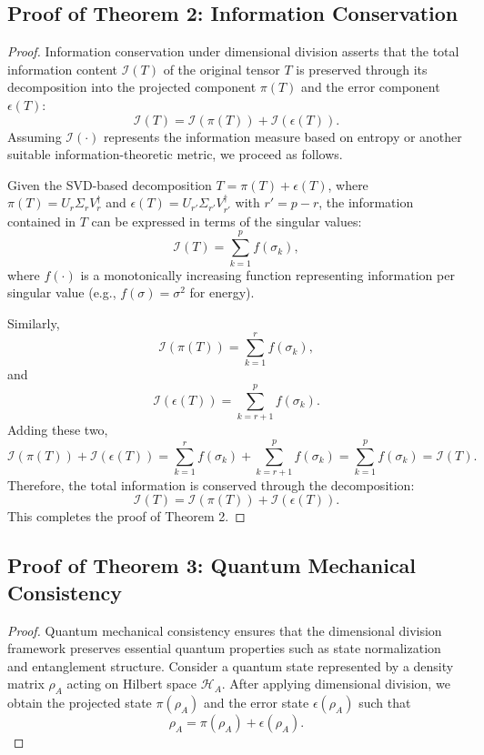 \documentclass[sn-mathphys-num]{sn-jnl}
\theoremstyle{thmstyleone}
\theoremstyle{thmstyletwo}
\theoremstyle{thmstylethree}
\begin{document}
\begin{appendices}
\subsection{Proof of Theorem 2: Information Conservation}\label{proof:theorem2}

\begin{proof}
Information conservation under dimensional division asserts that the total information content \( \mathcal{I}(T) \) of the original tensor \( T \) is preserved through its decomposition into the projected component \( \pi(T) \) and the error component \( \epsilon(T) \):
\[
\mathcal{I}(T) = \mathcal{I}(\pi(T)) + \mathcal{I}(\epsilon(T)).
\]
Assuming \( \mathcal{I}(\cdot) \) represents the information measure based on entropy or another suitable information-theoretic metric, we proceed as follows.

Given the SVD-based decomposition \( T = \pi(T) + \epsilon(T) \), where \( \pi(T) = U_r \Sigma_r V_r^\dagger \) and \( \epsilon(T) = U_{r'} \Sigma_{r'} V_{r'}^\dagger \) with \( r' = p - r \), the information contained in \( T \) can be expressed in terms of the singular values:
\[
\mathcal{I}(T) = \sum_{k=1}^p f(\sigma_k),
\]
where \( f(\cdot) \) is a monotonically increasing function representing information per singular value (e.g., \( f(\sigma) = \sigma^2 \) for energy).

Similarly,
\[
\mathcal{I}(\pi(T)) = \sum_{k=1}^r f(\sigma_k),
\]
and
\[
\mathcal{I}(\epsilon(T)) = \sum_{k=r+1}^p f(\sigma_k).
\]
Adding these two,
\[
\mathcal{I}(\pi(T)) + \mathcal{I}(\epsilon(T)) = \sum_{k=1}^r f(\sigma_k) + \sum_{k=r+1}^p f(\sigma_k) = \sum_{k=1}^p f(\sigma_k) = \mathcal{I}(T).
\]
Therefore, the total information is conserved through the decomposition:
\[
\mathcal{I}(T) = \mathcal{I}(\pi(T)) + \mathcal{I}(\epsilon(T)).
\]
This completes the proof of Theorem 2.
\end{proof}

\subsection{Proof of Theorem 3: Quantum Mechanical Consistency}\label{proof:theorem3}

\begin{proof}
Quantum mechanical consistency ensures that the dimensional division framework preserves essential quantum properties such as state normalization and entanglement structure. Consider a quantum state represented by a density matrix \( \rho_A \) acting on Hilbert space \( \mathcal{H}_A \). After applying dimensional division, we obtain the projected state \( \pi(\rho_A) \) and the error state \( \epsilon(\rho_A) \) such that
\[
\rho_A = \pi(\rho_A) + \epsilon(\rho_A).
\]


\end{proof}
\end{appendices}
\end{document}

